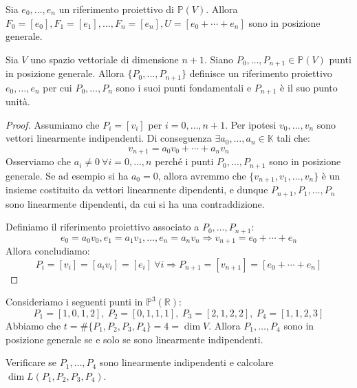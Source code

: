 \begin{ex}
Sia $e_0,\dots,e_n$ un riferimento proiettivo di $\mathbb{P}(V)$. Allora $F_0=[e_0],F_1=[e_1],\dots,F_n=[e_n],U=[e_0+\cdots+e_n]$ sono in posizione generale.
\end{ex}

\begin{lm}
Sia $V$ uno spazio vettoriale di dimensione $n+1$. Siano $P_0,\dots,P_{n+1} \in \mathbb{P}(V)$ punti in posizione generale. Allora $\{P_0,\dots,P_{n+1}\}$ definisce un riferimento proiettivo $e_0,\dots,e_n$ per cui $P_0,\dots,P_n$ sono i suoi punti fondamentali e $P_{n+1}$ è il suo punto unità.
\end{lm}

\begin{proof}
Assumiamo che $P_i=[v_i]$ per $i=0,\dots,n+1$. Per ipotesi $v_0,\dots,v_n$ sono vettori linearmente indipendenti. Di conseguenza $\exists a_0,\dots,a_n \in \mathbb{K}$ tali che:
$$v_{n+1}=a_0v_0+\cdots+a_nv_n$$
Osserviamo che $a_i \neq 0\ \forall i=0,\dots,n$ perché i punti $P_0,\dots,P_{n+1}$ sono in posizione generale. Se ad esempio si ha $a_0=0$, allora avremmo che $\{v_{n+1},v_1,\dots,v_n\}$ è un insieme costituito da vettori linearmente dipendenti, e dunque $P_{n+1},P_1,\dots,P_n$ sono linearmente dipendenti, da cui si ha una contraddizione. 

Definiamo il riferimento proiettivo associato a $P_0,\dots,P_{n+1}$:
$$e_0=a_0v_0, e_1=a_1v_1,\dots,e_n=a_nv_n \Rightarrow v_{n+1}=e_0+\cdots+e_n$$
Allora concludiamo:
$$P_i=[v_i]=[a_iv_i]=[e_i]\ \forall i \Rightarrow P_{n+1}=[v_{n+1}]=[e_0+\cdots+e_n]$$
\end{proof}

\begin{ex}
Consideriamo i seguenti punti in $\mathbb{P}^3(\mathbb{R})$:
$$P_1=[1,0,1,2],\ P_2=[0,1,1,1],\ P_3=[2,1,2,2],\ P_4=[1,1,2,3]$$
Abbiamo che $t=\#\{P_1,P_2,P_3,P_4\}=4=\dim V$. Allora $P_1,\dots,P_4$ sono in posizione generale se e solo se sono linearmente indipendenti.
\end{ex}

\begin{exc}
Verificare se $P_1,\dots,P_4$ sono linearmente indipendenti e calcolare $\dim L(P_1,P_2,P_3,P_4)$.
\end{exc}

